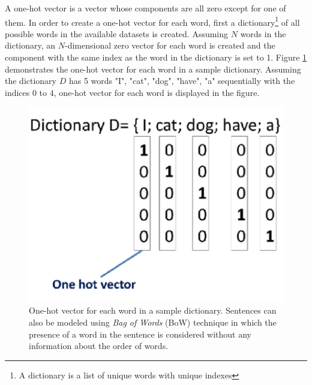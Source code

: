 \documentclass[preprint, 10pt]{elsarticle}
\begin{document}
		A one-hot vector is a vector whose components are all zero except for one of them. In order to create a one-hot vector for each word, first a dictionary\footnote{A dictionary is a list of unique words with unique indexes} of all possible words in the available datasets is created. Assuming $N$ words in the dictionary, an $N$-dimensional zero vector for each word is created and the component with the same index as the word in the dictionary is set to 1. Figure \ref{fig:onehot} demonstrates the one-hot vector for each word in a sample dictionary. Assuming the dictionary $D$ has 5 words "I", "cat", "dog", "have", "a" sequentially with the indices 0 to 4, one-hot vector for each word is displayed in the figure.
		
		\begin{figure}[h]
			\centering
			\includegraphics[scale=0.5]{Imgs/onehot.png}
			\caption{One-hot vector for each word in a sample dictionary. Sentences can also be modeled using \textit{Bag of Words} (BoW) technique in which the presence of a word in the sentence is considered without any information about the order of words.}
			\label{fig:onehot}
		\end{figure}
		
\end{document}
